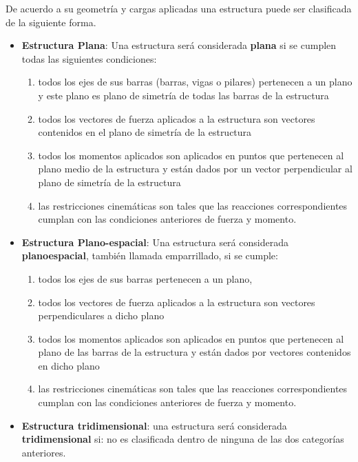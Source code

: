 De acuerdo a su geometría y cargas aplicadas una estructura puede ser clasificada de la siguiente forma.
%
\begin{itemize}
  \item \textbf{Estructura Plana}: Una estructura será considerada \textbf{plana} si se cumplen todas las siguientes condiciones:
    \begin{enumerate}
       \item todos los ejes de sus barras (barras, vigas o pilares) pertenecen a un plano y este plano es plano de simetría de todas las barras de la estructura
       \item todos los vectores de fuerza aplicados a la estructura son vectores contenidos en el plano de simetría de la estructura
       \item todos los momentos aplicados son aplicados en puntos que pertenecen al plano medio de la estructura y están dados por un vector perpendicular al plano de simetría de la estructura
       \item las restricciones cinemáticas son tales que las reacciones correspondientes cumplan con las condiciones anteriores de fuerza y momento.
    \end{enumerate}
  \item \textbf{Estructura Plano-espacial}: Una estructura será considerada \textbf{planoespacial}, también llamada emparrillado, si se cumple: 
    \begin{enumerate}
	\item todos los ejes de sus barras pertenecen a un plano,
	\item todos los vectores de fuerza aplicados a la estructura son vectores perpendiculares a dicho plano
	\item todos los momentos aplicados son aplicados en puntos que pertenecen al plano de las barras de la estructura y están dados por vectores contenidos en dicho plano
	\item las restricciones cinemáticas son tales que las reacciones correspondientes cumplan con las condiciones anteriores de fuerza y momento.
\end{enumerate}
  
  \item \textbf{Estructura tridimensional}: una estructura será considerada \textbf{tridimensional} si: no es clasificada dentro de ninguna de las dos categorías anteriores.
\end{itemize}







